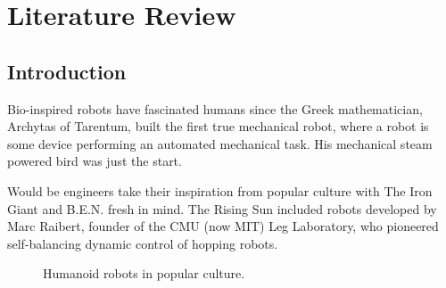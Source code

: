 \chapter{Literature Review}

\section{Introduction}

Bio-inspired robots have fascinated humans since the Greek mathematician, Archytas of Tarentum, built the first true mechanical robot, where a robot is some device performing an automated mechanical task. His mechanical steam powered bird was just the start.\cite{Isom2005}   

Would be engineers take their inspiration from popular culture with The Iron Giant and B.E.N. fresh in mind. The Rising Sun included robots developed by Marc Raibert, founder of the CMU (now MIT) Leg Laboratory, who pioneered self-balancing dynamic control of hopping robots. 

\begin{figure}
\centering
{}

\caption{Humanoid robots in popular culture.}
\end{figure}

